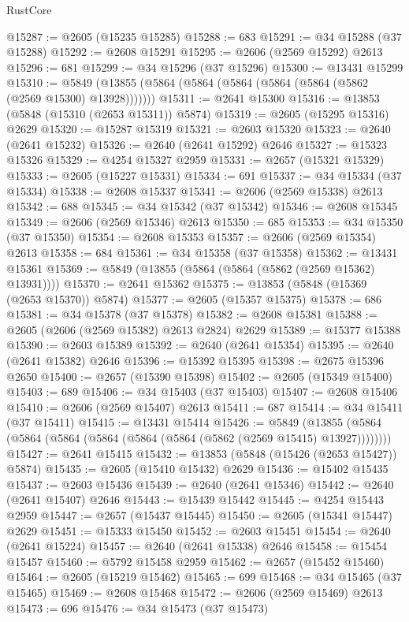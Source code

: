 \begin{lexlean}{RustCore}
\begin{coremodule}
@15287 := @2605 (@15235 @15285)
@15288 := 683
@15291 := @34 @15288 (@37 @15288)
@15292 := @2608 @15291
@15295 := @2606 (@2569 @15292) @2613
@15296 := 681
@15299 := @34 @15296 (@37 @15296)
@15300 := @13431 @15299
@15310 := @5849 (@13855 (@5864 (@5864 (@5864 (@5864 (@5864 (@5862 (@2569 @15300) @13928)))))))
@15311 := @2641 @15300
@15316 := @13853 (@5848 (@15310 (@2653 @15311)) @5874)
@15319 := @2605 (@15295 @15316) @2629
@15320 := @15287 @15319
@15321 := @2603 @15320
@15323 := @2640 (@2641 @15232)
@15326 := @2640 (@2641 @15292) @2646
@15327 := @15323 @15326
@15329 := @4254 @15327 @2959
@15331 := @2657 (@15321 @15329)
@15333 := @2605 (@15227 @15331)
@15334 := 691
@15337 := @34 @15334 (@37 @15334)
@15338 := @2608 @15337
@15341 := @2606 (@2569 @15338) @2613
@15342 := 688
@15345 := @34 @15342 (@37 @15342)
@15346 := @2608 @15345
@15349 := @2606 (@2569 @15346) @2613
@15350 := 685
@15353 := @34 @15350 (@37 @15350)
@15354 := @2608 @15353
@15357 := @2606 (@2569 @15354) @2613
@15358 := 684
@15361 := @34 @15358 (@37 @15358)
@15362 := @13431 @15361
@15369 := @5849 (@13855 (@5864 (@5864 (@5862 (@2569 @15362) @13931))))
@15370 := @2641 @15362
@15375 := @13853 (@5848 (@15369 (@2653 @15370)) @5874)
@15377 := @2605 (@15357 @15375)
@15378 := 686
@15381 := @34 @15378 (@37 @15378)
@15382 := @2608 @15381
@15388 := @2605 (@2606 (@2569 @15382) @2613 @2824) @2629
@15389 := @15377 @15388
@15390 := @2603 @15389
@15392 := @2640 (@2641 @15354)
@15395 := @2640 (@2641 @15382) @2646
@15396 := @15392 @15395
@15398 := @2675 @15396 @2650
@15400 := @2657 (@15390 @15398)
@15402 := @2605 (@15349 @15400)
@15403 := 689
@15406 := @34 @15403 (@37 @15403)
@15407 := @2608 @15406
@15410 := @2606 (@2569 @15407) @2613
@15411 := 687
@15414 := @34 @15411 (@37 @15411)
@15415 := @13431 @15414
@15426 := @5849
    (@13855 (@5864 (@5864 (@5864 (@5864 (@5864 (@5864 (@5862 (@2569 @15415) @13927))))))))
@15427 := @2641 @15415
@15432 := @13853 (@5848 (@15426 (@2653 @15427)) @5874)
@15435 := @2605 (@15410 @15432) @2629
@15436 := @15402 @15435
@15437 := @2603 @15436
@15439 := @2640 (@2641 @15346)
@15442 := @2640 (@2641 @15407) @2646
@15443 := @15439 @15442
@15445 := @4254 @15443 @2959
@15447 := @2657 (@15437 @15445)
@15450 := @2605 (@15341 @15447) @2629
@15451 := @15333 @15450
@15452 := @2603 @15451
@15454 := @2640 (@2641 @15224)
@15457 := @2640 (@2641 @15338) @2646
@15458 := @15454 @15457
@15460 := @5792 @15458 @2959
@15462 := @2657 (@15452 @15460)
@15464 := @2605 (@15219 @15462)
@15465 := 699
@15468 := @34 @15465 (@37 @15465)
@15469 := @2608 @15468
@15472 := @2606 (@2569 @15469) @2613
@15473 := 696
@15476 := @34 @15473 (@37 @15473)

\end{coremodule}
\end{lexlean}
